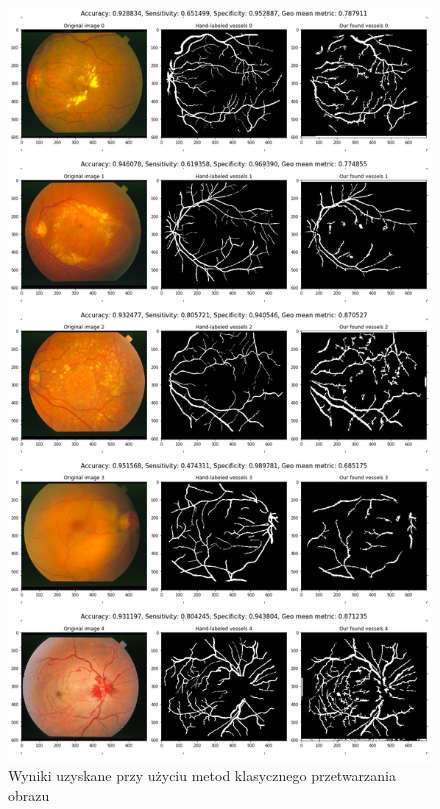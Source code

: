 \documentclass[11pt]{article}
\begin{document}
\begin{figure}[h]
    \centering
	\includegraphics[scale=0.4]{res/oko-1.png}
	\caption{Wyniki uzyskane przy użyciu metod klasycznego przetwarzania obrazu}
	\label{fig:demo}
\end{figure}
\end{document}
